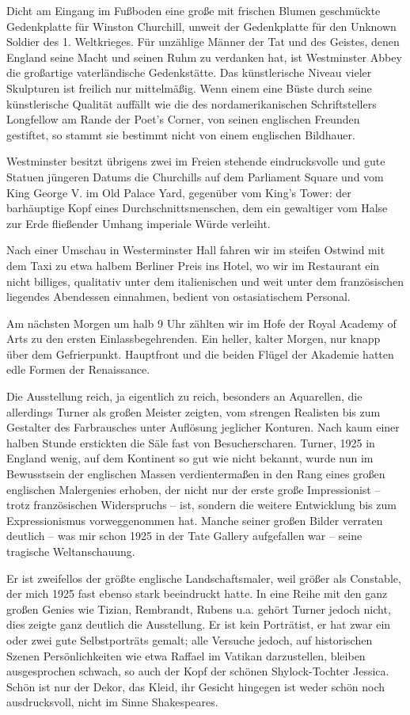 \documentclass[a5paper,pagesize,10pt,twoside=true]{scrbook}
\begin{document}
Dicht am Eingang im Fußboden eine große mit frischen Blumen geschmückte Gedenkplatte für Winston Churchill, unweit der Gedenkplatte für den Unknown Soldier des 1. Weltkrieges. Für unzählige Männer der Tat und des Geistes, denen England seine Macht und seinen Ruhm zu verdanken hat, ist Westminster Abbey die großartige vaterländische Gedenkstätte. Das künstlerische Niveau vieler Skulpturen ist freilich nur mittelmäßig. Wenn einem eine Büste durch seine künstlerische Qualität auffällt wie die des nordamerikanischen Schriftstellers Longfellow am Rande der Poet's Corner, von seinen englischen Freunden gestiftet, so stammt sie bestimmt nicht von einem englischen Bildhauer.

Westminster besitzt übrigens zwei im Freien stehende eindrucksvolle und gute Statuen jüngeren Datums die Churchills auf dem Parliament Square und vom King George V. im Old Palace Yard, gegenüber vom King's Tower: der barhäuptige Kopf eines Durchschnittsmenschen, dem ein gewaltiger vom Halse zur Erde fließender Umhang imperiale Würde verleiht.

Nach einer Umschau in Westerminster Hall fahren wir im steifen Ostwind mit dem Taxi zu etwa halbem Berliner Preis ins Hotel, wo wir im Restaurant ein nicht billiges, qualitativ unter dem italienischen und weit unter dem französischen liegendes Abendessen einnahmen, bedient von ostasiatischem Personal.

Am nächsten Morgen um halb 9 Uhr zählten wir im Hofe der Royal Academy of Arts zu den ersten Einlassbegehrenden. Ein heller, kalter Morgen, nur knapp über dem Gefrierpunkt. Hauptfront und die beiden Flügel der Akademie hatten edle Formen der Renaissance.

Die Ausstellung reich, ja eigentlich zu reich, besonders an Aquarellen, die allerdings Turner als großen Meister zeigten, vom strengen Realisten bis zum Gestalter des Farbrausches unter Auflösung jeglicher Konturen. Nach kaum einer halben Stunde erstickten die Säle fast von Besucherscharen. Turner, 1925 in England wenig, auf dem Kontinent so gut wie nicht bekannt, wurde nun im Bewusstsein der englischen Massen verdientermaßen in den Rang eines großen englischen Malergenies erhoben, der nicht nur der erste große Impressionist -- trotz französischen Widerspruchs -- ist, sondern die weitere Entwicklung bis zum Expressionismus vorweggenommen hat. Manche seiner großen Bilder verraten deutlich -- was mir schon 1925 in der Tate Gallery aufgefallen war -- seine tragische Weltanschauung.

Er ist zweifellos der größte englische Landschaftsmaler, weil größer als Constable, der mich 1925 fast ebenso stark beeindruckt hatte. In eine Reihe mit den ganz großen Genies wie Tizian, Rembrandt, Rubens u.a. gehört Turner jedoch nicht, dies zeigte ganz deutlich die Ausstellung. Er ist kein Porträtist, er hat zwar ein oder zwei gute Selbstporträts gemalt; alle Versuche jedoch, auf historischen Szenen Persönlichkeiten wie etwa Raffael im Vatikan darzustellen, bleiben ausgesprochen schwach, so auch der Kopf der schönen Shylock-Tochter Jessica. Schön ist nur der Dekor, das Kleid, ihr Gesicht hingegen ist weder schön noch ausdrucksvoll, nicht im Sinne Shakespeares.
\end{document}
